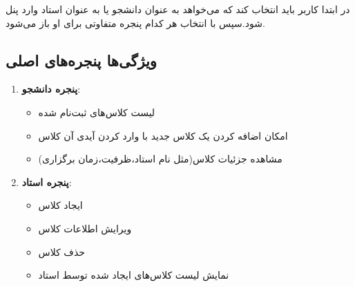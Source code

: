 
در ابتدا کاربر باید انتخاب کند که می‌خواهد به عنوان دانشجو یا به عنوان استاد وارد پنل شود.سپس با انتخاب هر کدام پنجره متفاوتی برای او باز می‌شود.

\subsection{ویژگی‌ها پنجره‌های اصلی}
\begin{enumerate}
    \item \textbf{پنجره دانشجو}:
    \begin{itemize}
        \item {لیست کلاس‌های ثبت‌نام شده}
        \item {امکان اضافه کردن یک کلاس جدید با وارد کردن آیدی آن کلاس}
        \item {مشاهده جزئیات کلاس(مثل نام استاد،ظرفیت،زمان برگزاری)}
    \end{itemize}
    \item \textbf{پنجره استاد}:
    \begin{itemize}
        \item {ایجاد کلاس}
        \item {ویرایش اطلاعات کلاس}
        \item {حذف کلاس}
        \item {نمایش لیست کلاس‌های ایجاد شده توسط استاد}
    \end{itemize}
\end{enumerate}